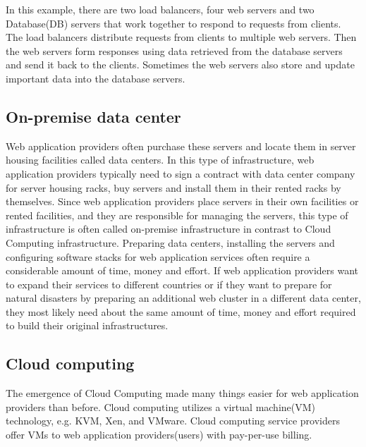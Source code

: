 In this example, there are two load balancers, four web servers and two Database(DB) servers that work together to respond to requests from clients.
The load balancers distribute requests from clients to multiple web servers.
Then the web servers form responses using data retrieved from the database servers and send it back to the clients.
Sometimes the web servers also store and update important data into the database servers.

\subsection{On-premise data center}

Web application providers often purchase these servers and locate them in server housing facilities called data centers.
In this type of infrastructure, web application providers typically need to sign a contract with data center company for server housing racks, buy servers and install them in their rented racks by themselves.
Since web application providers place servers in their own facilities or rented facilities, and they are responsible for managing the servers, this type of infrastructure is often called on-premise infrastructure in contrast to Cloud Computing infrastructure.
Preparing data centers, installing the servers and configuring software stacks for web application services often require a considerable amount of time, money and effort.
If web application providers want to expand their services to different countries or if they want to prepare for natural disasters by preparing an additional web cluster in a different data center, they most likely need about the same amount of time, money and effort required to build their original infrastructures.

\subsection{Cloud computing}

The emergence of Cloud Computing made many things easier for web application providers than before.
Cloud computing utilizes a virtual machine(VM) technology, e.g. KVM, Xen, and VMware.
Cloud computing service providers offer VMs to web application providers(users) with pay-per-use billing.

